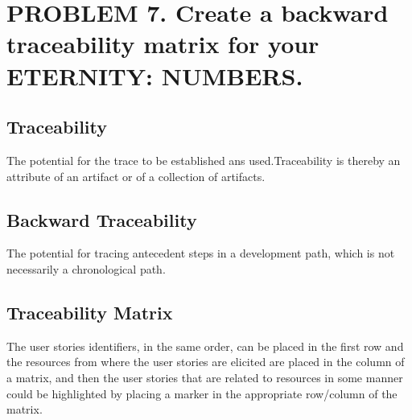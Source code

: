 \documentclass[12pt, a4paper]{article}
\begin{document}
\newpage
\section{PROBLEM 7. Create a backward traceability matrix for your ETERNITY: NUMBERS. }


\subsection{Traceability}
The potential for the trace to be established ans used.Traceability is thereby an attribute of an artifact or of a collection of artifacts.

 \subsection{Backward Traceability}
 The potential for tracing antecedent steps in a development path, which is not necessarily a chronological path.
 
 \subsection{Traceability Matrix}
 The user stories identifiers, in the same order, can be placed in the first row and the resources from where the user stories are elicited are placed in the column of a matrix, and then the user stories that are related to resources in some manner could be highlighted by placing a marker in the appropriate row/column of the matrix.
\end{document}
